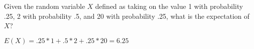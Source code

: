 \question Given the random variable $X$ defined as taking on the value 
1 with probability .25, 2 with probability .5, and 20 with probability 
.25, what is the expectation of $X$?
\begin{solution}[2cm]
$E(X) = .25*1 + .5*2 + .25*20 = 6.25$
\end{solution}